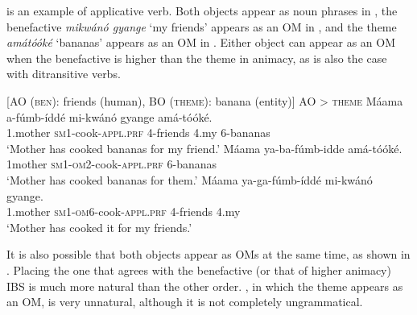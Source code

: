 \documentclass[output=paper,
            colorlinks, citecolor=brown
            ,draftmode
		  ]{langscibook}
\begin{document}
 is an example of applicative verb. Both objects appear as noun phrases in , the benefactive \textit{mikwánó gyange} ‘my friends’ appears as an OM in , and the theme \textit{amátóóké} ‘bananas’ appears as an OM in . Either object can appear as an OM when the benefactive is higher than the theme in animacy, as is also the case with ditransitive verbs.  



\ea%
    \label{ex:yoneda:31}
    [AO (\textsc{ben}): friends (human), BO (\textsc{theme}): banana (entity)]   AO > \textsc{theme}
    \ea\label{ex:yoneda:31a}\gll Máama     a-fúmb-íddé             mi-kwánó   gyange   amá-tóóké.\\
         1.mother    \textsc{sm1}-cook-\textsc{appl.prf}    4-friends    4.my    6-bananas\\
    \glt ‘Mother has cooked bananas for my friend.’
    \ex\label{ex:yoneda:31b}\gll Máama     ya-ba-fúmb-idde             amá-tóóké.\\
    1mother   \textsc{sm1-om2}-cook-\textsc{appl.prf}  6-bananas\\
    \glt ‘Mother has cooked bananas for them.’
    \ex\label{ex:yoneda:31c}\gll Máama     ya-ga-fúmb-íddé             mi-kwánó   gyange.\\
    1.mother    \textsc{sm1-om6}-cook-\textsc{appl.prf}  4-friends    4.my\\
    \glt ‘Mother has cooked it for my friends.’
    \z
\z
        



It is also possible that both objects appear as OMs at the same time, as shown in . Placing the one that agrees with the benefactive (or that of higher animacy) IBS is much more natural than the other order. , in which the theme appears as an OM, is very unnatural, although it is not completely ungrammatical.



\ea%
    \label{ex:yoneda:32}
    \z
\z
\end{document}
